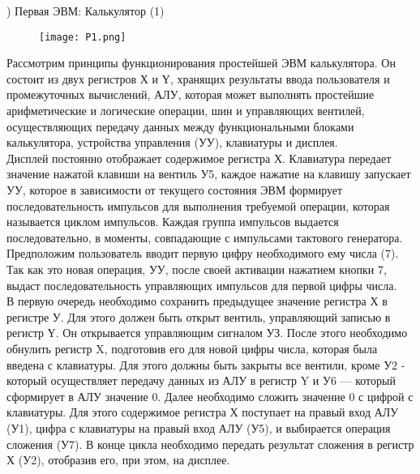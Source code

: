 ) Первая ЭВМ: Калькулятор (1) \\
\begin{figure}[H]
    \centering
    \texttt{[image: P1.png]}
\end{figure}
\noindent Рассмотрим принципы функционирования простейшей ЭВМ калькулятора. Он состоит из двух регистров Х и Ү, хранящих результаты ввода пользователя и промежуточных вычислений, АЛУ, которая может выполнять простейшие арифметические и логические операции, шин и управляющих вентилей, осуществляющих передачу данных между функциональными блоками калькулятора, устройства управления (УУ), клавиатуры и дисплея. \\
Дисплей постоянно отображает содержимое регистра Х. Клавиатура передает значение нажатой клавиши на вентиль У5, каждое нажатие на клавишу запускает УУ, которое в зависимости от текущего состояния ЭВМ формирует последовательность импульсов для выполнения требуемой операции, которая называется циклом импульсов. Каждая группа импульсов выдается последовательно, в моменты, совпадающие с импульсами тактового генератора. \\
Предположим пользователь вводит первую цифру необходимого ему числа (7). Так как это новая операция, УУ, после своей активации нажатием кнопки 7, выдаст последовательность управляющих импульсов для первой цифры числа. \\
В первую очередь необходимо сохранить предыдущее значение регистра Х в регистре У. Для этого должен быть открыт вентиль, управляющий записью в регистр Ү. Он открывается управляющим сигналом УЗ. После этого необходимо обнулить регистр X, подготовив его для новой цифры числа, которая была введена с клавиатуры. Для этого должны быть закрыты все вентили, кроме У2 - который осуществляет передачу данных из АЛУ в регистр Y и У6 — который сформирует в АЛУ значение 0. Далее необходимо сложить значение 0 с цифрой с клавиатуры. Для этого содержимое регистра Х поступает на правый вход АЛУ (У1), цифра с клавиатуры на правый вход АЛУ (У5), и выбирается операция сложения (У7). В конце цикла необходимо передать результат сложения в регистр Х (У2), отобразив его, при этом, на дисплее. \\

